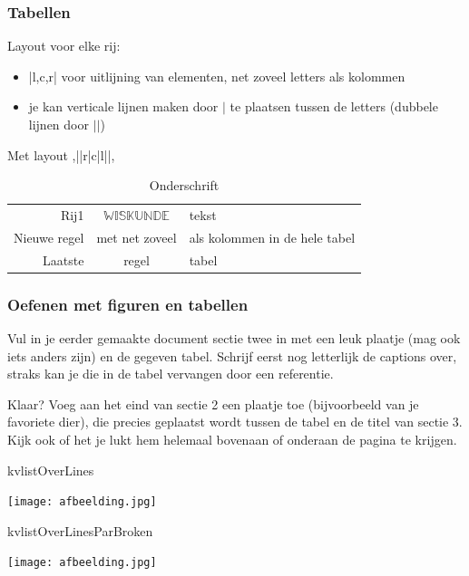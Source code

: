 \documentclass{cursuspresentatie}
\begin{document}
\begin{frame}
	\frametitle{Tabellen}
	Layout voor elke rij:
	\begin{itemize}
		\item \hll|l,c,r| voor uitlijning van elementen, net zoveel letters als kolommen
		\item je kan verticale lijnen maken door $|$ te plaatsen tussen de letters (dubbele lijnen door $||$)
	\end{itemize}
	\begin{block}{Met layout \hll,||r|c|l||,}
		{\begin{table}
				\centering
				\begin{tabular}{||r|c|l||}
					Rij1 & $\mathbb{WISKUNDE}$ & tekst\\
					Nieuwe regel & met net zoveel & als kolommen in de hele tabel\\
					\hline
					Laatste & regel & tabel
				\end{tabular}
				\caption{Onderschrift}
				\label{tab: tabel}
		\end{table}}
	\end{block}
\end{frame}

\begin{frame}
	\frametitle{Oefenen met figuren en tabellen}
	Vul in je eerder gemaakte document sectie twee in met een leuk plaatje (mag
	ook iets anders zijn) en de gegeven tabel. Schrijf eerst nog letterlijk de
	captions over, straks kan je die in de tabel vervangen door een referentie.

	Klaar?	Voeg aan het eind van sectie 2 een plaatje toe (bijvoorbeeld van je
	favoriete dier), die precies geplaatst wordt tussen de tabel en de titel van
	sectie 3. Kijk ook of het je lukt hem helemaal bovenaan of onderaan de
	pagina te krijgen.
\end{frame}



\begin{saveblock}{kvlistOverLines}
	\begin{highlightblock}
		\texttt{[image: afbeelding.jpg]}
	\end{highlightblock}
\end{saveblock}

\begin{saveblock}{kvlistOverLinesParBroken}
	\begin{highlightblock}
		\texttt{[image: afbeelding.jpg]}
	\end{highlightblock}
\end{saveblock}
\end{document}
